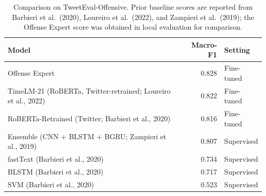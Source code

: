 
\begin{table}[htbp]
\centering
\caption{Comparison on TweetEval-Offensive. Prior baseline scores are reported from Barbieri et al.\ (2020), Loureiro et al.\ (2022), and Zampieri et al.\ (2019); the Offense Expert score was obtained in local evaluation for comparison.}
\label{tab:tweeteval-offensive-benchmark-comparison}
\small
\begin{tabular}{p{8.2cm} r p{2.0cm}}
\toprule
Model & Macro-F1 & Setting \\
\midrule
Offense Expert & 0.828 & Fine-tuned \\
TimeLM-21 (RoBERTa, Twitter-retrained; Loureiro et al., 2022) & 0.822 & Fine-tuned \\
RoBERTa-Retrained (Twitter; Barbieri et al., 2020) & 0.816 & Fine-tuned \\
Ensemble (CNN + BLSTM + BGRU; Zampieri et al., 2019) & 0.807 & Supervised \\
fastText (Barbieri et al., 2020) & 0.734 & Supervised \\
BLSTM (Barbieri et al., 2020) & 0.717 & Supervised \\
SVM (Barbieri et al., 2020) & 0.523 & Supervised \\
\bottomrule
\end{tabular}
\end{table}
